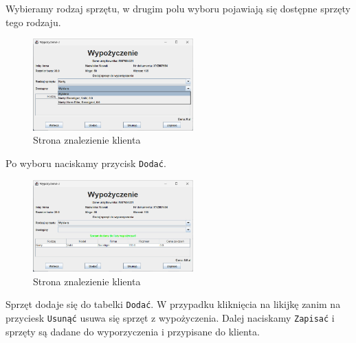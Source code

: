     
    Wybieramy rodzaj sprzętu, w drugim polu wyboru pojawiają się dostępne sprzęty tego rodzaju.
    \begin{figure}[h]
        \centering
        \includegraphics[width=0.55\textwidth]{figures/wypo5.jpg}
        \caption{Strona znalezienie klienta}
    \end{figure}
    \newline
    Po wyboru naciskamy przycisk \texttt{Dodać}.
    \begin{figure}[h]
        \centering
        \includegraphics[width=0.55\textwidth]{figures/wypo6.jpg}
        \caption{Strona znalezienie klienta}
    \end{figure}
    \newline
    Sprzęt dodaje się do tabelki \texttt{Dodać}. W przypadku kliknięcia na likijkę zanim na przyciesk \texttt{Usunąć} usuwa się sprzęt z wypożyczenia. Dalej naciskamy \texttt{Zapisać} i sprzęty są dadane do wyporzyczenia i przypisane do klienta.
    


